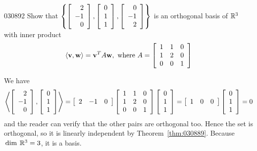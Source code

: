 \begin{example}{}{030892}
Show that $\left\{
\left[ \begin{array}{r}
2 \\
-1 \\
0
\end{array} \right], \left[ \begin{array}{r}
0 \\
1 \\
1
\end{array} \right], \left[ \begin{array}{r}
0 \\
-1 \\
2
\end{array} \right]
\right\}$ is an orthogonal basis of $\mathbb{R}^3$ with inner product
\begin{equation*}
\langle \textbf{v}, \textbf{w} \rangle = \textbf{v}^T A\textbf{w}, \mbox{ where } A =
\left[ \begin{array}{rrr}
1 & 1 & 0 \\
1 & 2 & 0 \\
0 & 0 & 1
\end{array} \right]
\end{equation*}
\vspace*{-2em}
\begin{solution}
We have
\begin{equation*}
\left\langle
\left[ \begin{array}{r}
2 \\
-1 \\
0
\end{array} \right],
\left[ \begin{array}{r}
0 \\
1 \\
1
\end{array} \right]
\right\rangle
= 
\left[ \begin{array}{ccc}
2 & -1 & 0
\end{array} \right]
\left[ \begin{array}{rrr}
1 & 1 & 0 \\
1 & 2 & 0 \\
0 & 0 & 1
\end{array} \right]
\left[ \begin{array}{r}
0 \\
1 \\
1
\end{array} \right]
=
\left[ \begin{array}{ccc}
1 & 0 & 0
\end{array} \right]
\left[ \begin{array}{r}
0 \\
1 \\
1
\end{array} \right]
= 0
\end{equation*}
and the reader can verify that the other pairs are orthogonal too. Hence the set is orthogonal, so it is linearly independent by Theorem~\ref{thm:030889}. Because $\thinspace\operatorname{dim\medspace} \mathbb{R}^3 = 3$, it is a basis.
\end{solution}
\end{example}

